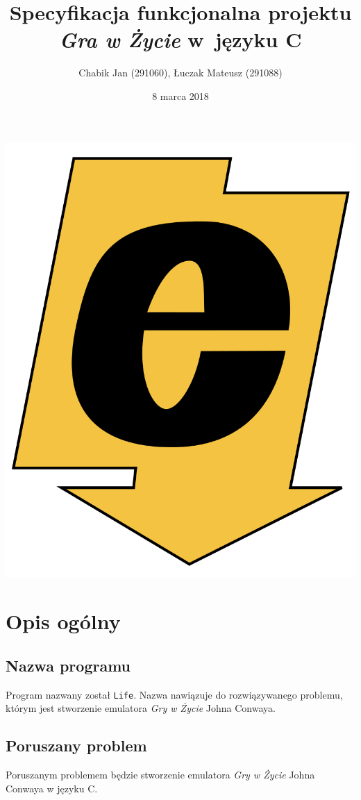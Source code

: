 \documentclass[a4paper,12pt]{article}
\title{Specyfikacja funkcjonalna projektu \textit{Gra w Życie} w~języku C}
\author{Chabik Jan (291060), Łuczak Mateusz (291088)}
\date{8 marca 2018}
\begin{document}
\maketitle
\thispagestyle{empty}
\begin{center}
	\includegraphics[scale=0.1]{logo_ee_big.png}
\end{center}
\newpage

\tableofcontents
{}
\newpage

\section{Opis ogólny}
\subsection{Nazwa programu}

Program nazwany został \texttt{Life}. Nazwa nawiązuje do rozwiązywanego problemu, którym jest stworzenie emulatora \textit{Gry w Życie} Johna Conwaya.

\subsection{Poruszany problem}
Poruszanym problemem będzie stworzenie emulatora \textit{Gry w Życie} Johna Conwaya w języku C.
\end{document}

